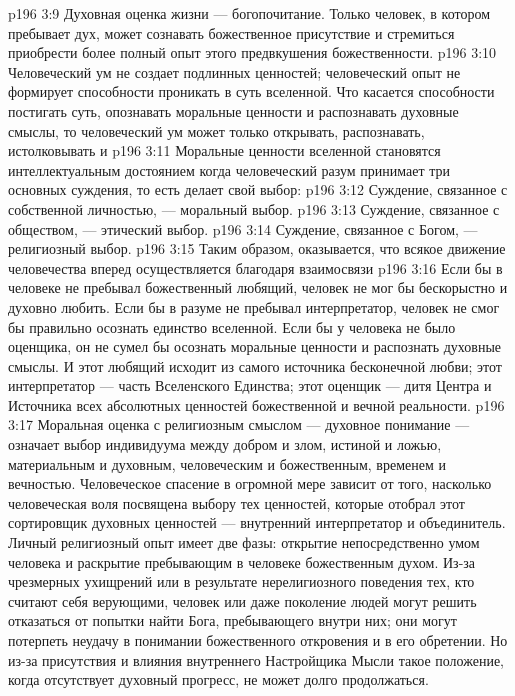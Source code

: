 \vs p196 3:9 \pc {}\bibnobreakspace Духовная оценка жизни --- богопочитание. Только человек, в котором пребывает дух, может сознавать божественное присутствие и стремиться приобрести более полный опыт этого предвкушения божественности.
\vs p196 3:10 \pc Человеческий ум не создает подлинных ценностей; человеческий опыт не формирует способности проникать в суть вселенной. Что касается способности постигать суть, опознавать моральные ценности и распознавать духовные смыслы, то человеческий ум может только открывать, распознавать, истолковывать и 
\vs p196 3:11 Моральные ценности вселенной становятся интеллектуальным достоянием когда человеческий разум принимает три основных суждения, то есть делает свой выбор:
\vs p196 3:12 \bibnobreakspace Суждение, связанное с собственной личностью, --- моральный выбор.
\vs p196 3:13 \bibnobreakspace Суждение, связанное с обществом, --- этический выбор.
\vs p196 3:14 \bibnobreakspace Суждение, связанное с Богом, --- религиозный выбор.
\vs p196 3:15 \pc Таким образом, оказывается, что всякое движение человечества вперед осуществляется благодаря взаимосвязи 
\vs p196 3:16 Если бы в человеке не пребывал божественный любящий, человек не мог бы бескорыстно и духовно любить. Если бы в разуме не пребывал интерпретатор, человек не смог бы правильно осознать единство вселенной. Если бы у человека не было оценщика, он не сумел бы осознать моральные ценности и распознать духовные смыслы. И этот любящий исходит из самого источника бесконечной любви; этот интерпретатор --- часть Вселенского Единства; этот оценщик --- дитя Центра и Источника всех абсолютных ценностей божественной и вечной реальности.
\vs p196 3:17 Моральная оценка с религиозным смыслом --- духовное понимание --- означает выбор индивидуума между добром и злом, истиной и ложью, материальным и духовным, человеческим и божественным, временем и вечностью. Человеческое спасение в огромной мере зависит от того, насколько человеческая воля посвящена выбору тех ценностей, которые отобрал этот сортировщик духовных ценностей --- внутренний интерпретатор и объединитель. Личный религиозный опыт имеет две фазы: открытие непосредственно умом человека и раскрытие пребывающим в человеке божественным духом. Из\hyp{}за чрезмерных ухищрений или в результате нерелигиозного поведения тех, кто считают себя верующими, человек или даже поколение людей могут решить отказаться от попытки найти Бога, пребывающего внутри них; они могут потерпеть неудачу в понимании божественного откровения и в его обретении. Но из\hyp{}за присутствия и влияния внутреннего Настройщика Мысли такое положение, когда отсутствует духовный прогресс, не может долго продолжаться.
